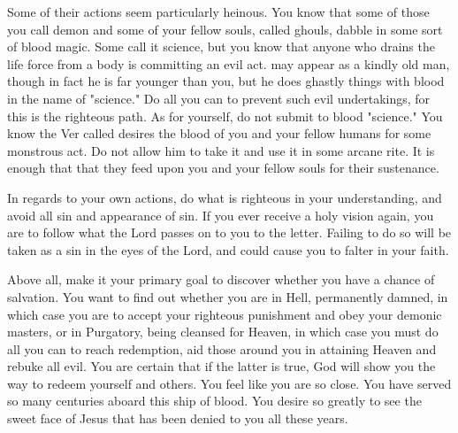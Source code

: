 \documentclass[char]{guildcamp4}
\begin{document}
Some of their actions seem particularly heinous. You know that some of those you call demon and some of your fellow souls, called ghouls, dabble in some sort of blood magic. Some call it science, but you know that anyone who drains the life force from a body is committing an evil act. \cJames{} may appear as a kindly old man, though in fact he is far younger than you, but he does ghastly things with blood in the name of "science." Do all you can to prevent such evil undertakings, for this is the righteous path. As for yourself, do not submit to blood "science." You know the Ver called \cVthree{} desires the blood of you and your fellow humans for some monstrous act. Do not allow him to take it and use it in some arcane rite. It is enough that that they feed upon you and your fellow souls for their sustenance.

In regards to your own actions, do what is righteous in your understanding, and avoid all sin and appearance of sin. If you ever receive a holy vision again, you are to follow what the Lord passes on to you to the letter. Failing to do so will be taken as a sin in the eyes of the Lord, and could cause you to falter in your faith.

Above all, make it your primary goal to discover whether you have a chance of salvation. You want to find out whether you are in Hell, permanently damned, in which case you are to accept your righteous punishment and obey your demonic masters, or in Purgatory, being cleansed for Heaven, in which case you must do all you can to reach redemption, aid those around you in attaining Heaven and rebuke all evil. You are certain that if the latter is true, God will show you the way to redeem yourself and others. You feel like you are so close. You have served so many centuries aboard this ship of blood. You desire so greatly to see the sweet face of Jesus that has been denied to you all these years.
\end{document}
